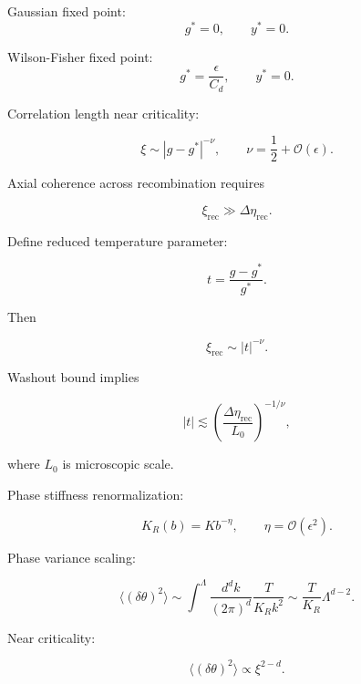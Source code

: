 \documentclass[12pt]{article}
\begin{document}
Gaussian fixed point:
\begin{equation}
g^\ast=0,
\qquad
y^\ast=0.
\end{equation}

Wilson-Fisher fixed point:
\begin{equation}
g^\ast=\frac{\epsilon}{C_d},
\qquad
y^\ast=0.
\end{equation}

Correlation length near criticality:

\begin{equation}
\xi
\sim
|g-g^\ast|^{-\nu},
\qquad
\nu
=
\frac{1}{2}
+
\mathcal{O}(\epsilon).
\end{equation}

Axial coherence across recombination requires

\begin{equation}
\xi_{\mathrm{rec}}
\gg
\Delta\eta_{\mathrm{rec}}.
\end{equation}

Define reduced temperature parameter:

\begin{equation}
t
=
\frac{g-g^\ast}{g^\ast}.
\end{equation}

Then

\begin{equation}
\xi_{\mathrm{rec}}
\sim
|t|^{-\nu}.
\end{equation}

Washout bound implies

\begin{equation}
|t|
\lesssim
\left(
\frac{\Delta\eta_{\mathrm{rec}}}{L_0}
\right)^{-1/\nu},
\end{equation}

where $L_0$ is microscopic scale.

Phase stiffness renormalization:

\begin{equation}
K_R(b)
=
K b^{-\eta},
\qquad
\eta
=
\mathcal{O}(\epsilon^2).
\end{equation}

Phase variance scaling:

\begin{equation}
\langle (\delta\theta)^2 \rangle
\sim
\int^{\Lambda}
\frac{d^d k}{(2\pi)^d}
\frac{T}{K_R k^2}
\sim
\frac{T}{K_R}
\Lambda^{d-2}.
\end{equation}

Near criticality:

\begin{equation}
\langle (\delta\theta)^2 \rangle
\propto
\xi^{2-d}.
\end{equation}
\end{document}
